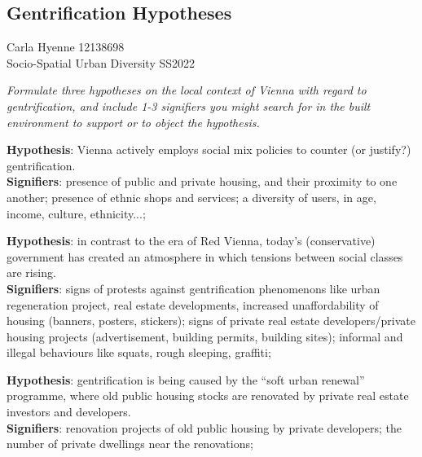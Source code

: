 \documentclass{article}
\begin{document}
\pagebreak

\subsection{Gentrification Hypotheses}

\begin{flushright}
Carla Hyenne 12138698\\
Socio-Spatial Urban Diversity SS2022
\end{flushright}

\textit{Formulate three hypotheses on the local context of Vienna with regard to gentrification, and include 1-3 signifiers you might search for in the built environment to support or to object the hypothesis.}

\textbf{Hypothesis}: Vienna actively employs social mix policies to counter (or justify?) gentrification.\\
\textbf{Signifiers}: presence of public and private housing, and their proximity to one another; presence of ethnic shops and services; a diversity of users, in age, income, culture, ethnicity...;

\textbf{Hypothesis}: in contrast to the era of Red Vienna, today's (conservative) government has created an atmosphere in which tensions between social classes are rising. \\
\textbf{Signifiers}: signs of protests against gentrification phenomenons like urban regeneration project, real estate developments, increased unaffordability of housing (banners, posters, stickers); signs of private real estate developers/private housing projects (advertisement, building permits, building sites); informal and illegal behaviours like squats, rough sleeping, graffiti;

\textbf{Hypothesis}: gentrification is being caused by the ``soft urban renewal'' programme, where old public housing stocks are renovated by private real estate investors and developers. \\
\textbf{Signifiers}: renovation projects of old public housing by private developers; the number of private dwellings near the renovations;
\end{document}
